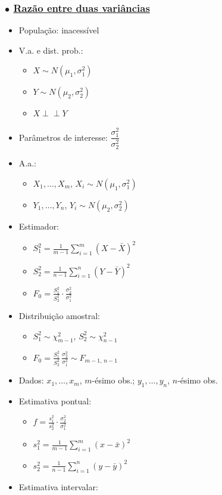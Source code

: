 \documentclass[11pt,a4paper]{article}
\newcommand{\ind}{\perp\!\!\!\perp}
\begin{document}
\subsubsection*{$\bullet$ \underline{Razão entre duas variâncias}}
\begin{itemize}
  \item População: inacessível
  \item V.a. e dist. prob.:
  \begin{itemize}[label=$\cdot$]
    \item $X \sim N(\mu_1,\sigma_1^2)$
    \item $Y \sim N(\mu_2,\sigma_2^2)$
    \item $X \ind Y$
  \end{itemize}
  \item Parâmetros de interesse: $\dfrac{\sigma_1^2}{\sigma_2^2}$
  \item A.a.:
  \begin{itemize}[label=$\cdot$]
    \item $X_1,\ldots,X_m$, $X_i \sim N(\mu_1,\sigma_1^2)$
    \item $Y_1,\ldots,Y_n$, $Y_i \sim N(\mu_2,\sigma_2^2)$
  \end{itemize}
  \item Estimador:
  \begin{itemize}[label=$\cdot$]
    \item $\displaystyle S_1^2 = \frac{1}{m-1}\sum_{i=1}^{m}(X-\bar{X})^2$
    \item $\displaystyle S_2^2 = \frac{1}{n-1}\sum_{i=1}^{n}(Y-\bar{Y})^2$
    \item $\displaystyle F_0 = \frac{S_1^2}{S_2^2}\cdot\frac{\sigma_2^2}{\sigma_1^2}$
  \end{itemize}
  \item Distribuição amostral:
  \begin{itemize}[label=$\cdot$]
    \item $S_1^2 \sim \chi^2_{m-1}$, \quad $S_2^2 \sim \chi^2_{n-1}$
    \item $\displaystyle F_0 = \frac{S_1^2}{S_2^2}\,\frac{\sigma_2^2}{\sigma_1^2} \sim F_{m-1,\,n-1}$
  \end{itemize}
  \item Dados: $x_1,\ldots,x_m$, $m$-ésimo obs.; \; $y_1,\ldots,y_n$, $n$-ésimo obs.
  \item Estimativa pontual:
  \begin{itemize}[label=$\cdot$]
    \item $\displaystyle f = \frac{s_1^2}{s_2^2}\cdot\frac{\sigma_2^2}{\sigma_1^2}$
    \item $\displaystyle s_1^2 = \frac{1}{m-1}\sum_{i=1}^{m}(x-\bar{x})^2$
    \item $\displaystyle s_2^2 = \frac{1}{n-1}\sum_{i=1}^{n}(y-\bar{y})^2$
  \end{itemize}
  \item Estimativa intervalar:
\end{itemize}
\end{document}
